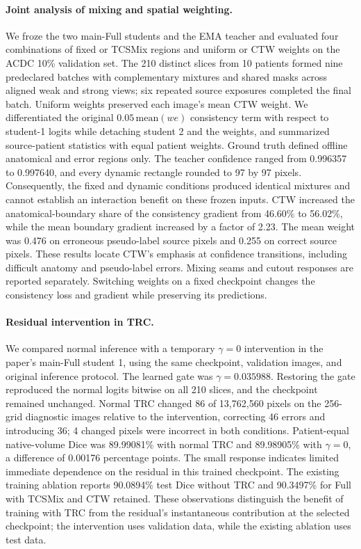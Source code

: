 \paragraph{Joint analysis of mixing and spatial weighting.}
We froze the two main-Full students and the EMA teacher and evaluated four combinations of fixed or TCSMix regions and uniform or CTW weights on the ACDC 10\% validation set. The 210 distinct slices from 10 patients formed nine predeclared batches with complementary mixtures and shared masks across aligned weak and strong views; six repeated source exposures completed the final batch. Uniform weights preserved each image's mean CTW weight. We differentiated the original $0.05\,\mathrm{mean}(w e)$ consistency term with respect to student-1 logits while detaching student 2 and the weights, and summarized source-patient statistics with equal patient weights. Ground truth defined offline anatomical and error regions only.
The teacher confidence ranged from 0.996357 to 0.997640, and every dynamic rectangle rounded to 97 by 97 pixels. Consequently, the fixed and dynamic conditions produced identical mixtures and cannot establish an interaction benefit on these frozen inputs. CTW increased the anatomical-boundary share of the consistency gradient from 46.60\% to 56.02\%, while the mean boundary gradient increased by a factor of 2.23. The mean weight was 0.476 on erroneous pseudo-label source pixels and 0.255 on correct source pixels. These results locate CTW's emphasis at confidence transitions, including difficult anatomy and pseudo-label errors. Mixing seams and cutout responses are reported separately. Switching weights on a fixed checkpoint changes the consistency loss and gradient while preserving its predictions.

\paragraph{Residual intervention in TRC.}
We compared normal inference with a temporary $\gamma=0$ intervention in the paper's main-Full student 1, using the same checkpoint, validation images, and original inference protocol. The learned gate was $\gamma=0.035988$. Restoring the gate reproduced the normal logits bitwise on all 210 slices, and the checkpoint remained unchanged.
Normal TRC changed 86 of 13,762,560 pixels on the 256-grid diagnostic images relative to the intervention, correcting 46 errors and introducing 36; 4 changed pixels were incorrect in both conditions. Patient-equal native-volume Dice was 89.99081\% with normal TRC and 89.98905\% with $\gamma=0$, a difference of 0.00176 percentage points. The small response indicates limited immediate dependence on the residual in this trained checkpoint. The existing training ablation reports 90.0894\% test Dice without TRC and 90.3497\% for Full with TCSMix and CTW retained. These observations distinguish the benefit of training with TRC from the residual's instantaneous contribution at the selected checkpoint; the intervention uses validation data, while the existing ablation uses test data.

